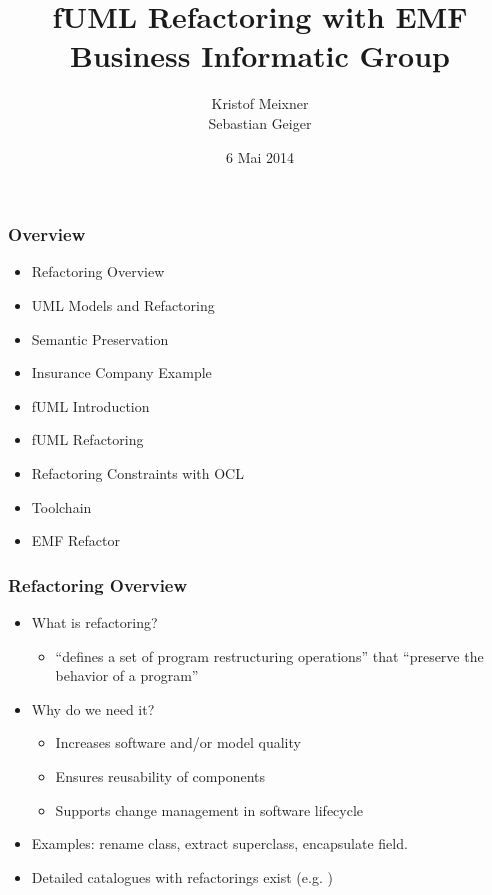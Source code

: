 \documentclass{beamer}
\begin{document}
\author{Kristof Meixner \\ Sebastian Geiger}
\date{6 Mai 2014}
\title{fUML Refactoring with EMF\\\small{Business Informatic Group}}


\begin{frame}
 \maketitle
\end{frame}


\begin{frame}
 \frametitle{Overview}



\begin{itemize}
 \item Refactoring Overview
 \item UML Models and Refactoring
 \item Semantic Preservation
 \item Insurance Company Example
 \item fUML Introduction
 \item fUML Refactoring
 \item Refactoring Constraints with OCL
 \item Toolchain
 \item EMF Refactor
\end{itemize}

\end{frame}

\begin{frame}[fragile]
\frametitle{Refactoring Overview}
\begin{itemize}
 \item What is refactoring?
 \begin{itemize}
  \item ``defines a set of program restructuring operations'' that ``preserve the behavior of a program'' \cite{mast:REFOOF}
 \end{itemize}
 \item Why do we need it?
 \begin{itemize}
  \item Increases software and/or model quality
  \item Ensures reusability of components
  \item Supports change management in software lifecycle
 \end{itemize}
 \item Examples: rename class, extract superclass, encapsulate field.
 \item Detailed catalogues with refactorings exist (e.g. \cite{fow99})
\end{itemize}

\end{frame}
\end{document}
